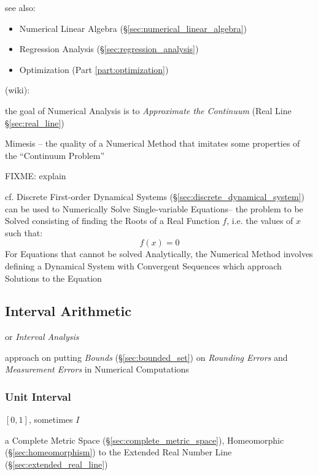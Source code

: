 {see also:
\begin{itemize}
  \item Numerical Linear Algebra (\S\ref{sec:numerical_linear_algebra})
  \item Regression Analysis (\S\ref{sec:regression_analysis})
  \item Optimization (Part \ref{part:optimization})
\end{itemize}

(wiki):

the goal of Numerical Analysis is to \emph{Approximate the Continuum}
(Real Line \S\ref{sec:real_line})

Mimesis -- the quality of a Numerical Method that imitates some properties of
the ``Continuum Problem''

FIXME: explain

\asterism

\fist cf. Discrete First-order Dynamical Systems
(\S\ref{sec:discrete_dynamical_system}) can be used to Numerically Solve
Single-variable Equations-- the problem to be Solved consisting of finding the
Roots of a Real Function $f$, i.e. the values of $x$ such that:
\[
  f(x) = 0
\]
For Equations that cannot be solved Analytically, the Numerical Method involves
defining a Dynamical System with Convergent Sequences which approach Solutions
to the Equation



\subsection{Interval Arithmetic}\label{sec:interval_arithmetic}

or \emph{Interval Analysis}

approach on putting \emph{Bounds} (\S\ref{sec:bounded_set}) on \emph{Rounding
  Errors} and \emph{Measurement Errors} in Numerical Computations



\subsubsection{Unit Interval}\label{sec:unit_interval}

$[0,1]$, sometimes $I$

a Complete Metric Space (\S\ref{sec:complete_metric_space}),
Homeomorphic (\S\ref{sec:homeomorphism}) to the Extended Real Number
Line (\S\ref{sec:extended_real_line})



}
